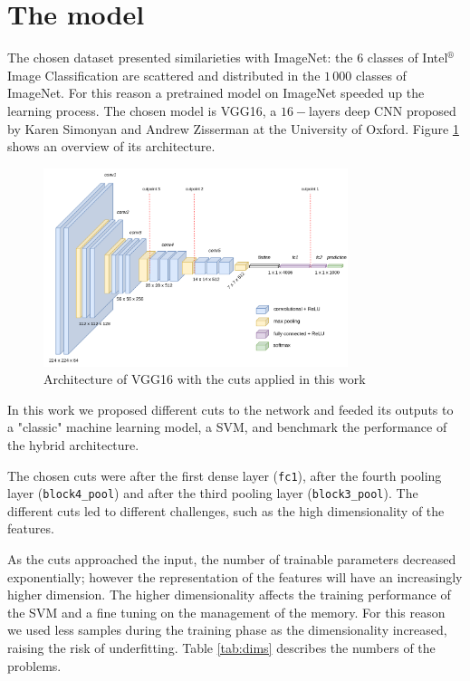 \documentclass[compsoc]{IEEEtran}
\begin{document}
\section{The model} 
The chosen dataset presented similarieties with ImageNet: the $6$ classes of Intel$^\circledR$ Image Classification are scattered and distributed in the $1\,000$ classes of ImageNet. For this reason a pretrained model on ImageNet speeded up the learning process. The chosen model is VGG16, a $16-$layers deep CNN proposed by Karen Simonyan and Andrew Zisserman at the University of Oxford\cite{vgg16}. Figure \ref{fig:vgg16} shows an overview of its architecture.


\begin{figure}[ht!]
\centering                                                                        
\includegraphics[width=3.5in]{../images/vgg16.png}
\captionsetup{justification=centering}                                                                                         
\caption{Architecture of VGG16 with the cuts applied in this work}
\label{fig:vgg16}                                                                                                                               
\end{figure}

In this work we proposed different cuts to the network and feeded its outputs to a "classic" machine learning model, a SVM, and benchmark the performance of the hybrid architecture. \par

The chosen cuts were after the first dense layer (\texttt{fc1}), after the fourth pooling layer (\texttt{block4\_pool}) 
and after the third pooling layer (\texttt{block3\_pool}). The different cuts led to different challenges, such as the high dimensionality of the features.


As the cuts approached the input, the number of trainable parameters decreased exponentially; however the representation of the features will have an increasingly higher dimension. The higher dimensionality affects the training performance of the SVM and a fine tuning on the management of the memory. For this reason we used less samples during the training phase as the dimensionality increased, raising the risk of underfitting. Table \ref{tab:dims} describes the numbers of the problems.
\end{document}
